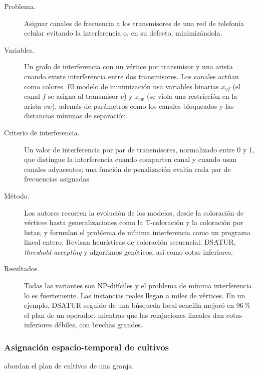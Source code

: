 \begin{description}
  \item[Problema.] Asignar canales de frecuencia a los transmisores de una red de telefonía celular evitando la interferencia o, en su defecto, minimizándola.
  \item[Variables.] Un grafo de interferencia con un vértice por transmisor y una arista cuando existe interferencia entre dos transmisores. Los canales actúan como colores. El modelo de minimización usa variables binarias $x_{vf}$ (el canal $f$ se asigna al transmisor $v$) y $z_{vw}$ (se viola una restricción en la arista $vw$), además de parámetros como los canales bloqueados y las distancias mínimas de separación.
  \item[Criterio de interferencia.] Un valor de interferencia por par de transmisores, normalizado entre 0 y 1, que distingue la interferencia cuando comparten canal y cuando usan canales adyacentes; una función de penalización evalúa cada par de frecuencias asignadas.
  \item[Método.] Los autores recorren la evolución de los modelos, desde la coloración de vértices hasta generalizaciones como la T-coloración y la coloración por listas, y formulan el problema de mínima interferencia como un programa lineal entero. Revisan heurísticas de coloración secuencial, DSATUR, \textit{threshold accepting} y algoritmos genéticos, así como cotas inferiores.
  \item[Resultados.] Todas las variantes son NP-difíciles y el problema de mínima interferencia lo es fuertemente. Las instancias reales llegan a miles de vértices. En un ejemplo, DSATUR seguido de una búsqueda local sencilla mejoró en 96\,\% el plan de un operador, mientras que las relajaciones lineales dan cotas inferiores débiles, con brechas grandes.
\end{description}

\subsubsection{Asignación espacio-temporal de cultivos}

\textcite{akplogan2011} abordan el plan de cultivos de una granja.

